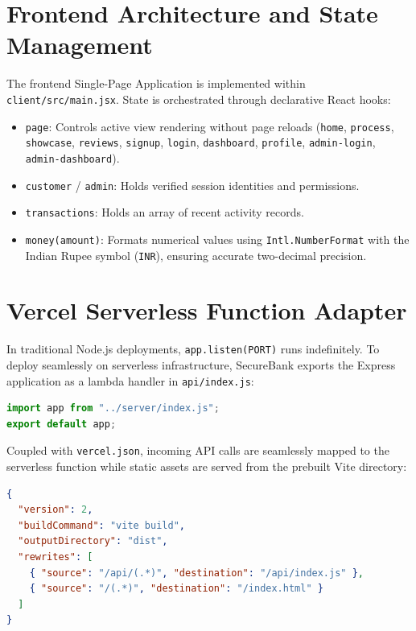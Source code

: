\section{Frontend Architecture and State Management}
The frontend Single-Page Application is implemented within \texttt{client/src/main.jsx}. State is orchestrated through declarative React hooks:
\begin{itemize}
    \item \texttt{page}: Controls active view rendering without page reloads (\texttt{home}, \texttt{process}, \texttt{showcase}, \texttt{reviews}, \texttt{signup}, \texttt{login}, \texttt{dashboard}, \texttt{profile}, \texttt{admin-login}, \texttt{admin-dashboard}).
    \item \texttt{customer} / \texttt{admin}: Holds verified session identities and permissions.
    \item \texttt{transactions}: Holds an array of recent activity records.
    \item \texttt{money(amount)}: Formats numerical values using \texttt{Intl.NumberFormat} with the Indian Rupee symbol (\texttt{INR}), ensuring accurate two-decimal precision.
\end{itemize}

\section{Vercel Serverless Function Adapter}
In traditional Node.js deployments, \texttt{app.listen(PORT)} runs indefinitely. To deploy seamlessly on serverless infrastructure, SecureBank exports the Express application as a lambda handler in \texttt{api/index.js}:

\begin{lstlisting}[language=JavaScript, caption={Serverless Lambda Entry Point}]
import app from "../server/index.js";
export default app;
\end{lstlisting}

Coupled with \texttt{vercel.json}, incoming API calls are seamlessly mapped to the serverless function while static assets are served from the prebuilt Vite directory:
\begin{lstlisting}[language=json, caption={Vercel Serverless Rewrite Configuration}]
{
  "version": 2,
  "buildCommand": "vite build",
  "outputDirectory": "dist",
  "rewrites": [
    { "source": "/api/(.*)", "destination": "/api/index.js" },
    { "source": "/(.*)", "destination": "/index.html" }
  ]
}
\end{lstlisting}
